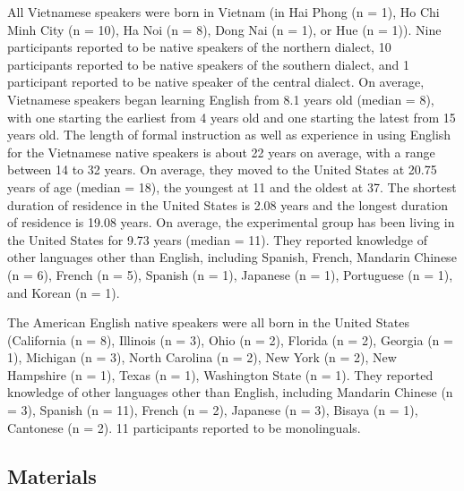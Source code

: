 \documentclass[a4paper]{article}
\begin{document}
All Vietnamese speakers were born in Vietnam (in Hai Phong (n = 1), Ho Chi Minh City (n = 10), Ha Noi (n = 8), Dong Nai (n = 1), or Hue (n = 1)). Nine participants reported to be native speakers of the northern dialect, 10 participants reported to be native speakers of the southern dialect, and 1 participant reported to be native speaker of the central dialect. On average, Vietnamese speakers began learning English from 8.1 years old (median = 8), with one starting the earliest from 4 years old and one starting the latest from 15 years old. The length of formal instruction as well as experience in using English for the Vietnamese native speakers is about 22 years on average, with a range between 14 to 32 years. On average, they moved to the United States at 20.75 years of age (median = 18), the youngest at 11 and the oldest at 37. The shortest duration of residence in the United States is 2.08 years and the longest duration of residence is 19.08 years. On average, the experimental group has been living in the United States for 9.73 years (median = 11). They reported knowledge of other languages other than English, including Spanish, French, Mandarin Chinese (n = 6), French (n = 5), Spanish (n = 1), Japanese (n = 1), Portuguese (n = 1), and Korean (n = 1).

The American English native speakers were all born in the United States (California (n = 8), Illinois (n = 3), Ohio (n = 2), Florida (n = 2), Georgia (n = 1), Michigan (n = 3), North Carolina (n = 2), New York (n = 2), New Hampshire (n = 1), Texas (n = 1), Washington State (n = 1). They reported knowledge of other languages other than English, including Mandarin Chinese (n = 3), Spanish (n = 11), French (n = 2), Japanese (n = 3), Bisaya (n = 1), Cantonese (n = 2). 11 participants reported to be monolinguals.

\subsection{Materials}
\end{document}
